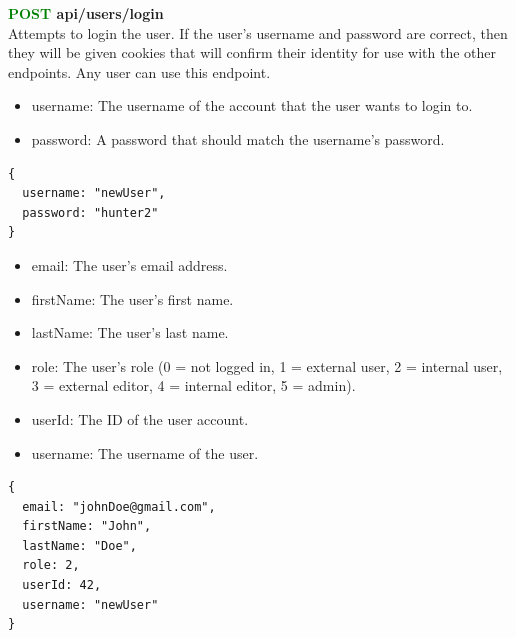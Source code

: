 \documentclass[onecolumn, draftclsnofoot,10pt, compsoc, usenames, dvipsnames]{IEEEtran}
\begin{document}
\noindent
\textbf{\textcolor{Green}{POST} api/users/login} \\
Attempts to login the user. If the user's username and password are correct, then they will be given cookies that will confirm their identity for use with the other endpoints. Any user can use this endpoint.
\begin{itemize}
    \item username: The username of the account that the user wants to login to.
    \item password: A password that should match the username's password.
\end{itemize}
\begin{lstlisting}[caption=Example Request Body]
{
  username: "newUser",
  password: "hunter2"
}
\end{lstlisting}
\begin{itemize}
    \item email: The user's email address.
    \item firstName: The user's first name.
    \item lastName: The user's last name.
    \item role: The user's role (0 = not logged in, 1 = external user, 2 = internal user, 3 = external editor, 4 = internal editor, 5 = admin).
    \item userId: The ID of the user account.
    \item username: The username of the user.
\end{itemize}
\begin{lstlisting}[caption=Example Response]
{ 
  email: "johnDoe@gmail.com",
  firstName: "John",
  lastName: "Doe",
  role: 2,
  userId: 42,
  username: "newUser"
}
\end{lstlisting}
\\~\\
\end{document}
